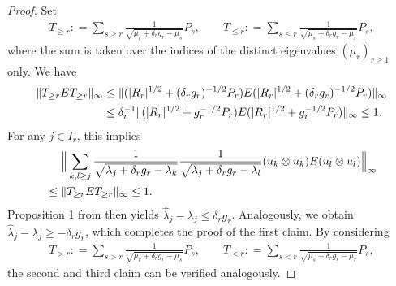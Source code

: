 \documentclass[a4paper,11pt]{article} %
\numberwithin{equation}{section}
\theoremstyle{definition}
\theoremstyle{remark}
\theoremstyle{plain}
\begin{document}
\begin{proof} %
  Set
  \begin{align}
        T_{ \ge r }:
    =
        \sum_{ s \ge r }
        \frac{1}{ \sqrt{ \mu_{r} + \delta_{r} g_{r} - \mu_{s} } } 
        P_{s},
    \qquad 
        T_{ \le r }: 
    = 
        \sum_{ s \le r } 
        \frac{1}{ \sqrt{ \mu_{s} + \delta_{r} g_{r} - \mu_{r} } } 
        P_{s},
  \end{align}
  where the sum is taken over the indices of the distinct eigenvalues \( (
  \mu_{r} )_{ r \ge 1 } \) only.
  We have
  \begin{align}
            \| T_{ \ge r } E T_{ \ge r } \|_{ \infty } 
    & \le 
            \| ( | R_{r} |^{1/2} + ( \delta_{r} g_{r} )^{-1/2} P_{r} ) E
               ( | R_{r} |^{1/2} + ( \delta_{r} g_{r} )^{-1/2} P_{r} )
            \|_{ \infty } 
    \\
    & \le 
            \delta_{r}^{-1} 
            \| ( | R_{r} |^{1/2} + g_{r}^{-1/2} P_{r} ) E
               ( | R_{r} |^{1/2} + g_{r}^{-1/2} P_{r} )
            \|_{ \infty } 
    \le 
            1.
    \notag
  \end{align}
  For any \( j \in I_{r} \), this implies
  \begin{align}
    & \ \ \ \
          \Big\| \sum_{ k, l \ge j }
                 \frac{1}
                 { \sqrt{ \lambda_{j} + \delta_{r} g_{r} - \lambda_{k} } } 
                 \frac{1}
                 { \sqrt{ \lambda_{j} + \delta_{r} g_{r} - \lambda_{l} } } 
                 ( u_{k} \otimes u_{k} ) E ( u_{l} \otimes u_{l} ) 
          \Big\|_{ \infty }
    \\
    & \le 
          \| T_{ \ge r } E T_{ \ge r } \|_{ \infty } 
    \le 
          1.
    \notag 
  \end{align}
  Proposition 1 from \cite{JirakWahl2018PerturbationBoundsUnderRelativeGap}
  then yields \( \widehat{ \lambda }_{j} - \lambda_{j} \le \delta_{r} g_{r} \).  
  Analogously, we obtain 
  \( \widehat{ \lambda }_{j} - \lambda_{j} \ge - \delta_{r} g_{r} \), which
  completes the proof of the first claim.
  By considering 
  \begin{align}
        T_{ > r }:
    =
        \sum_{ s > r }
        \frac{1}{ \sqrt{ \mu_{r} + \delta_{r} g_{r} - \mu_{s} } } 
        P_{s},
    \qquad 
        T_{ <  r }: 
    = 
        \sum_{ s < r } 
        \frac{1}{ \sqrt{ \mu_{s} + \delta_{r} g_{r} - \mu_{r} } } 
        P_{s},
  \end{align}
  the second and third claim can be verified analogously.
\end{proof}%
\end{document}
